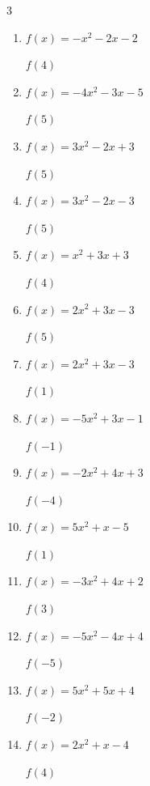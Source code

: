 \begin{multicols}{3}
\begin{enumerate}
  \item $f(x)=-x^{2}-2x-2$

$f(4)$
        \phantom{$= -26$}

  \item $f(x)=-4x^{2}-3x-5$

$f(5)$
        \phantom{$= -120$}

\columnbreak %

\resetques

  \item $f(x)=3x^{2}-2x+3$

$f(5)$
        \phantom{$= 68$}

  \item $f(x)=3x^{2}-2x-3$

$f(5)$
        \phantom{$= 62$}

  \item $f(x)=x^{2}+3x+3$

$f(4)$
        \phantom{$= 31$}

  \item $f(x)=2x^{2}+3x-3$

$f(5)$
        \phantom{$= 62$}

  \item $f(x)=2x^{2}+3x-3$

$f(1)$
        \phantom{$= 2$}

  \item $f(x)=-5x^{2}+3x-1$

$f(-1)$
        \phantom{$= -9$}

  \item $f(x)=-2x^{2}+4x+3$

$f(-4)$
        \phantom{$= -45$}

  \item $f(x)=5x^{2}+x-5$

$f(1)$
        \phantom{$= 1$}

  \item $f(x)=-3x^{2}+4x+2$

$f(3)$
        \phantom{$= -13$}

  \item $f(x)=-5x^{2}-4x+4$

$f(-5)$
        \phantom{$= -101$}

  \item $f(x)=5x^{2}+5x+4$

$f(-2)$
        \phantom{$= 14$}

  \item $f(x)=2x^{2}+x-4$

$f(4)$
        \phantom{$= 32$}


\end{enumerate}
\end{multicols}
